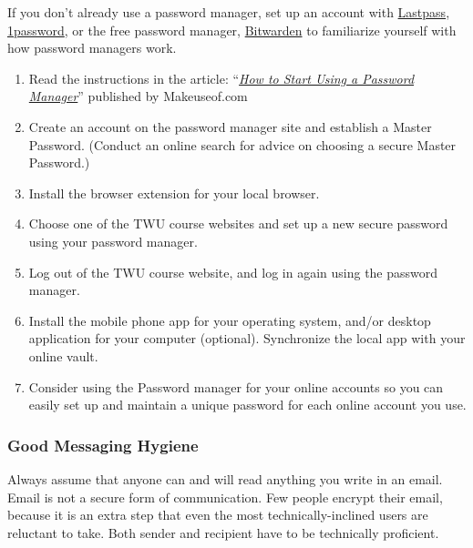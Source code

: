 \documentclass[
]{book}
\providecommand{\tightlist}{%
  \setlength{\itemsep}{0pt}\setlength{\parskip}{0pt}}
\theoremstyle{definition}
\theoremstyle{definition}
\theoremstyle{definition}
\theoremstyle{definition}
\theoremstyle{remark}
\begin{document}
\begin{reflect}
If you don't already use a password manager, set up an account with \href{https://www.lastpass.com/}{Lastpass}, \href{https://1password.com/}{1password}, or the free password manager, \href{https://bitwarden.com/}{Bitwarden} to familiarize yourself with how password managers work.

\begin{enumerate}
\def\labelenumi{\arabic{enumi}.}
\tightlist
\item
  Read the instructions in the article: ``\href{https://www.makeuseof.com/how-to-start-using-password-manager/}{\emph{How to Start Using a Password Manager}}'' published by Makeuseof.com\\
\item
  Create an account on the password manager site and establish a Master Password. (Conduct an online search for advice on choosing a secure Master Password.)\\
\item
  Install the browser extension for your local browser.\\
\item
  Choose one of the TWU course websites and set up a new secure password using your password manager.\\
\item
  Log out of the TWU course website, and log in again using the password manager.\\
\item
  Install the mobile phone app for your operating system, and/or desktop application for your computer (optional). Synchronize the local app with your online vault.\\
\item
  Consider using the Password manager for your online accounts so you can easily set up and maintain a unique password for each online account you use.
\end{enumerate}
\end{reflect}

\hypertarget{good-messaging-hygiene}{%
\subsubsection*{Good Messaging Hygiene}\label{good-messaging-hygiene}}

Always assume that anyone can and will read anything you write in an email. Email is not a secure form of communication. Few people encrypt their email, because it is an extra step that even the most technically-inclined users are reluctant to take. Both sender and recipient have to be technically proficient.
\end{document}
